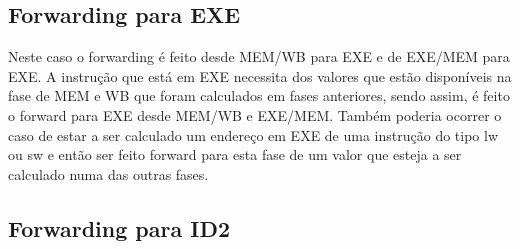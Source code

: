 \documentclass[pdftex,12pt,a4paper]{report}
\begin{document}
\subsection{Forwarding para EXE}

\begin{table}[!htb]
\centering
\label{my-label}
\end{table}

Neste caso o forwarding é feito desde MEM/WB para EXE e de EXE/MEM para EXE. A instrução que está em EXE necessita dos valores que estão disponíveis na fase de MEM e WB que foram calculados em fases anteriores, sendo assim, é feito o forward para EXE desde MEM/WB e EXE/MEM. Também poderia ocorrer o caso de estar a ser calculado um endereço em EXE de uma instrução do tipo lw ou sw e então ser feito forward para esta fase de um valor que esteja a ser calculado numa das outras fases.

\subsection{Forwarding para ID2}
\end{document}

